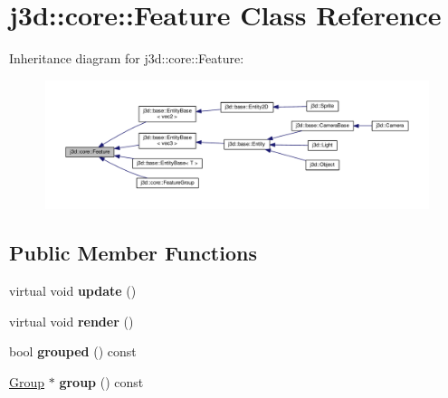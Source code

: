 \hypertarget{classj3d_1_1core_1_1Feature}{}\section{j3d\+:\+:core\+:\+:Feature Class Reference}
\label{classj3d_1_1core_1_1Feature}


Inheritance diagram for j3d\+:\+:core\+:\+:Feature\+:
\nopagebreak
\begin{figure}[H]
\begin{center}
\leavevmode
\includegraphics[width=350pt]{classj3d_1_1core_1_1Feature__inherit__graph}
\end{center}
\end{figure}
\subsection*{Public Member Functions}
\begin{DoxyCompactItemize}
\item 
\hypertarget{classj3d_1_1core_1_1Feature_a50b34b8e0ea2efaf582baf3effd9f4a8}{}virtual void {\bfseries update} ()\label{classj3d_1_1core_1_1Feature_a50b34b8e0ea2efaf582baf3effd9f4a8}

\item 
\hypertarget{classj3d_1_1core_1_1Feature_a93803d5262dea61d6def23e4351f3be1}{}virtual void {\bfseries render} ()\label{classj3d_1_1core_1_1Feature_a93803d5262dea61d6def23e4351f3be1}

\item 
\hypertarget{classj3d_1_1core_1_1Feature_a097dea6a9545ad5e79d360286f17ff72}{}bool {\bfseries grouped} () const \label{classj3d_1_1core_1_1Feature_a097dea6a9545ad5e79d360286f17ff72}

\item 
\hypertarget{classj3d_1_1core_1_1Feature_a0e9554c37fa23c1482d85e1ee648470f}{}\hyperlink{classj3d_1_1core_1_1Group}{Group} $\ast$ {\bfseries group} () const \label{classj3d_1_1core_1_1Feature_a0e9554c37fa23c1482d85e1ee648470f}

\end{DoxyCompactItemize}
